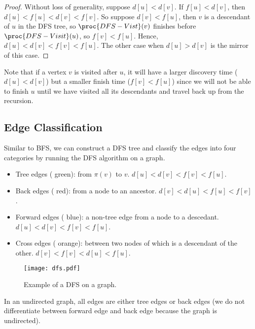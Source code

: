\begin{proof}
    Without loss of generality, suppose $d[u] < d[v]$. If $f[u] < d[v]$, then $d[u] < f[u] < d[v] < f[v]$. So suppose $d[v] < f[u]$, then $v$ is a descendant of $u$ in the DFS tree, so $\proc{DFS-Vist}(v)$ finishes before $\proc{DFS-Visit}(u)$, so $f[v] < f[u]$. Hence, $d[u] < d[v] < f[v] < f[u]$. The other case when $d[u] > d[v]$ is the mirror of this case.
\end{proof}

Note that if a vertex $v$ is visited after $u$, it will have a larger discovery time ($d[u] < d[v]$) but a smaller finish time ($f[v] < f[u]$) since we will not be able to finish $u$ until we have visited all its descendants and travel back up from the recursion.

\subsection{Edge Classification}

Similar to BFS, we can construct a DFS tree and classify the edges into four categories by running the DFS algorithm on a graph.

\begin{itemize}    
    \item Tree edges ({\color{seagreen} green}): from $\pi(v)$ to $v$. $d[u] < d[v] < f[v] < f[u]$.
    \item Back edges ({\color{red} red}): from a node to an ancestor. $d[v] < d[u] < f[u] < f[v]$.
    \item Forward edges ({\color{blue} blue}): a non-tree edge from a node to a descedant. $d[u] < d[v] < f[v] < f[u]$.
    \item Cross edges ({\color{orange} orange}): between two nodes of which is a descendant of the other. $d[v] < f[v] < d[u] < f[u]$.
\end{itemize}

\begin{figure}[htbp]
    \centering
    \texttt{[image: dfs.pdf]}

    \hfill

    \caption{Example of a DFS on a graph.}
    \label{fig:dfs-edges}
\end{figure}


\begin{theorem}
    In an undirected graph, all edges are either tree edges or back edges (we do not differentiate between forward edge and back edge because the graph is undirected).
\end{theorem}

